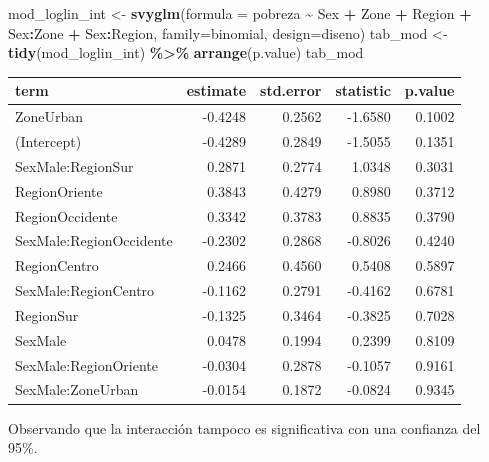\documentclass[
  12pt,
]{book}
\newenvironment{Shaded}{\begin{snugshade}}{\end{snugshade}}
\newcommand{\AttributeTok}[1]{\textcolor[rgb]{0.13,0.29,0.53}{#1}}
\newcommand{\FunctionTok}[1]{\textcolor[rgb]{0.13,0.29,0.53}{\textbf{#1}}}
\newcommand{\NormalTok}[1]{#1}
\newcommand{\OtherTok}[1]{\textcolor[rgb]{0.56,0.35,0.01}{#1}}
\newcommand{\SpecialCharTok}[1]{\textcolor[rgb]{0.81,0.36,0.00}{\textbf{#1}}}
\begin{document}
\begin{Shaded}
\begin{Highlighting}[]
\NormalTok{mod\_loglin\_int }\OtherTok{\textless{}{-}} \FunctionTok{svyglm}\NormalTok{(}\AttributeTok{formula =}\NormalTok{ pobreza }\SpecialCharTok{\textasciitilde{}}\NormalTok{ Sex }\SpecialCharTok{+}\NormalTok{ Zone }\SpecialCharTok{+}\NormalTok{ Region }\SpecialCharTok{+} 
\NormalTok{                           Sex}\SpecialCharTok{:}\NormalTok{Zone }\SpecialCharTok{+}\NormalTok{ Sex}\SpecialCharTok{:}\NormalTok{Region,}
                           \AttributeTok{family=}\NormalTok{binomial, }
                           \AttributeTok{design=}\NormalTok{diseno)}
\NormalTok{tab\_mod }\OtherTok{\textless{}{-}} \FunctionTok{tidy}\NormalTok{(mod\_loglin\_int) }\SpecialCharTok{\%\textgreater{}\%} \FunctionTok{arrange}\NormalTok{(p.value)}
\NormalTok{tab\_mod}
\end{Highlighting}
\end{Shaded}

\begin{tabular}{l|r|r|r|r}
\hline
term & estimate & std.error & statistic & p.value\\
\hline
ZoneUrban & -0.4248 & 0.2562 & -1.6580 & 0.1002\\
\hline
(Intercept) & -0.4289 & 0.2849 & -1.5055 & 0.1351\\
\hline
SexMale:RegionSur & 0.2871 & 0.2774 & 1.0348 & 0.3031\\
\hline
RegionOriente & 0.3843 & 0.4279 & 0.8980 & 0.3712\\
\hline
RegionOccidente & 0.3342 & 0.3783 & 0.8835 & 0.3790\\
\hline
SexMale:RegionOccidente & -0.2302 & 0.2868 & -0.8026 & 0.4240\\
\hline
RegionCentro & 0.2466 & 0.4560 & 0.5408 & 0.5897\\
\hline
SexMale:RegionCentro & -0.1162 & 0.2791 & -0.4162 & 0.6781\\
\hline
RegionSur & -0.1325 & 0.3464 & -0.3825 & 0.7028\\
\hline
SexMale & 0.0478 & 0.1994 & 0.2399 & 0.8109\\
\hline
SexMale:RegionOriente & -0.0304 & 0.2878 & -0.1057 & 0.9161\\
\hline
SexMale:ZoneUrban & -0.0154 & 0.1872 & -0.0824 & 0.9345\\
\hline
\end{tabular}

Observando que la interacción tampoco es significativa con una confianza del 95\%.
\end{document}
